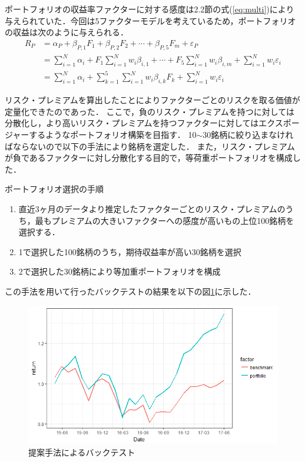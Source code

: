 ﻿\documentclass[11pt]{jreport}
\begin{document}
ポートフォリオの収益率ファクターに対する感度は2.2節の式(\ref{eq:multi})により与えられていた．今回は5ファクターモデルを考えているため，ポートフォリオの収益は次のように与えられる．
\begin{equation}
\begin{split}
R_P &= \alpha_P + \beta_{P,1} F_1 + \beta_{P,2} F_2 + \cdots + \beta_{P,5} F_m + \varepsilon_P\\
&=\sum_{i=1}^N \alpha_i + F_1 \sum_{i=1}^N w_i \beta_{i,1} + \cdots + F_5 \sum_{i=1}^N w_i \beta_{i,m} + \sum_{i=1}^N w_i\varepsilon_i\\
&= \sum_{i=1}^N \alpha_i + \sum_{k=1}^5 \sum_{i=1}^N w_i \beta_{i,k} F_k + \sum_{i=1}^N w_i\varepsilon_i
\label{eq:port}
\end{split}
\end{equation}

リスク・プレミアムを算出したことによりファクターごとのリスクを取る価値が定量化できたのであった．
ここで，負のリスク・プレミアムを持つに対しては分散化し，より高いリスク・プレミアムを持つファクターに対してはエクスポージャーするようなポートフォリオ構築を目指す．
10$\sim$30銘柄に絞り込まなければならないので以下の手法により銘柄を選定した．
また，リスク・プレミアムが負であるファクターに対し分散化する目的で，等荷重ポートフォリオを構成した．

\begin{itembox}[l]{ポートフォリオ選択の手順}
\begin{enumerate}
\item 直近3ヶ月のデータより推定したファクターごとのリスク・プレミアムのうち，最もプレミアムの大きいファクターへの感度が高いもの上位100銘柄を選択する．
\item 1で選択した100銘柄のうち，期待収益率が高い30銘柄を選択
\item 2で選択した30銘柄により等加重ポートフォリオを構成
\end{enumerate}
\end{itembox}

この手法を用いて行ったバックテストの結果を以下の図\ref{fig:teiann}に示した．

\begin{figure}[H]
	\begin{center}
		\includegraphics[width=15cm]{./fig/teiann.png}
		\caption{提案手法によるバックテスト}
		\label{fig:teiann}
	\end{center}
\end{figure}
\end{document}
